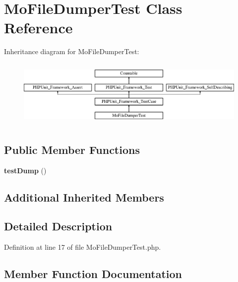 \section{Mo\+File\+Dumper\+Test Class Reference}
\label{class_symfony_1_1_component_1_1_translation_1_1_tests_1_1_dumper_1_1_mo_file_dumper_test}
Inheritance diagram for Mo\+File\+Dumper\+Test\+:\begin{figure}[H]
\begin{center}
\leavevmode
\includegraphics[height=3.303835cm]{class_symfony_1_1_component_1_1_translation_1_1_tests_1_1_dumper_1_1_mo_file_dumper_test}
\end{center}
\end{figure}
\subsection*{Public Member Functions}
\begin{DoxyCompactItemize}
\item 
{\bf test\+Dump} ()
\end{DoxyCompactItemize}
\subsection*{Additional Inherited Members}


\subsection{Detailed Description}


Definition at line 17 of file Mo\+File\+Dumper\+Test.\+php.



\subsection{Member Function Documentation}
